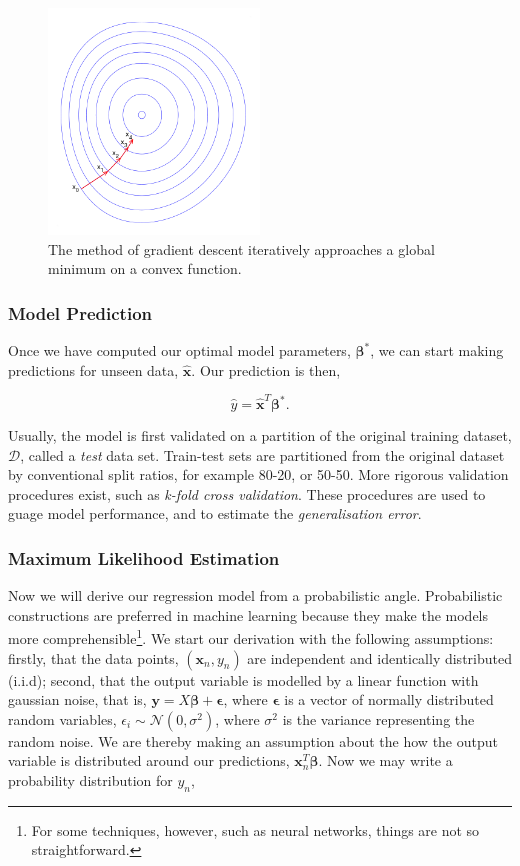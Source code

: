 \documentclass[11pt]{amsart}
\begin{document}
\begin{figure}[!ht]
\centering
\includegraphics[width=0.5\textwidth]{Figures/gradientdescent.png}
\caption{The method of gradient descent iteratively approaches a global minimum on a convex function.\cite{gradientdescent}}
\label{fig:gradientdescent}
\end{figure}

\subsubsection{Model Prediction}

Once we have computed our optimal model parameters, $\boldsymbol\beta^*$, we can start making predictions for unseen data, $\hat{\mathbf{x}}$. Our prediction is then,

$$\hat{y} = \hat{\mathbf{x}}^T\boldsymbol\beta^*.$$

Usually, the model is first validated on a partition of the original training dataset, $\mathcal{D}$, called a \emph{test} data set. Train-test sets are partitioned from the original dataset by conventional split ratios, for example 80-20, or 50-50. More rigorous validation procedures exist, such as \emph{k-fold cross validation}. These procedures are used to guage model performance, and to estimate the \emph{generalisation error}.

\subsubsection{Maximum Likelihood Estimation}

Now we will derive our regression model from a probabilistic angle. Probabilistic constructions are preferred in machine learning because they make the models more comprehensible\footnote{For some techniques, however, such as neural networks, things are not so straightforward.}. We start our derivation with the following assumptions: firstly, that the data points, $(\mathbf{x}_n, y_n)$ are independent and identically distributed (i.i.d); second, that the output variable is modelled by a linear function with gaussian noise, that is, $\mathbf{y} = X\boldsymbol\beta + \boldsymbol\epsilon$, where $\boldsymbol\epsilon$ is a vector of normally distributed random variables, $\epsilon_i \sim \mathcal{N}(0, \sigma^2)$, where $\sigma^2$ is the variance representing the random noise. We are thereby making an assumption about the how the output variable is distributed around our predictions, $\mathbf{x}_n^T\boldsymbol\beta$. Now we may write a probability distribution for $y_n$,
\end{document}
